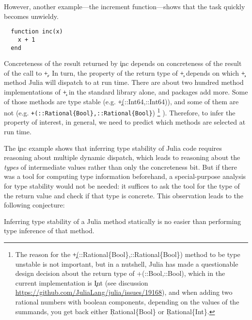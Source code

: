 \documentclass[sigplan,screen]{acmart}
\begin{document}
However, another example---the increment function---shows that the task quickly
becomes unwieldy.
%
\begin{lstlisting}
  function inc(x)
    x + 1
  end
\end{lstlisting}
%
Concreteness of the result returned by \c{inc} depends on concreteness of
the result of the call to \c{+}. In turn, the property of the return type of
\c{+} depends on which \c{+} method Julia will dispatch to at run time.
There are about two hundred method implementations of \c{+} in the standard
library alone, and packages add more. Some of those methods are type stable
(e.g. \c{+(::Int64,::Int64)}), and some of them are not (e.g.
\lstinline|+(::Rational{Bool},::Rational{Bool}|)
\footnote{%
  The reason for the
  \c{+(::Rational\{Bool\},::Rational\{Bool\})} method to be type
  unstable is not important, but in a nutshell, Julia has made a questionable
  design decision about the return type of \c{{+}(::Bool,::Bool)}, which in the
  current implementation is \c{Int}
  (see discussion \url{https://github.com/JuliaLang/julia/issues/19168}),
  and when adding two rational numbers with boolean components, depending on the
  values of the summands, you get back either \c{Rational\{Bool\}} or
  \c{Rational\{Int\}}.}
).
Therefore,
to infer the property of interest, in general,
we need to predict which methods are selected at run time.

The \c{inc} example shows that inferring type stability of Julia code
requires
reasoning about %
multiple dynamic dispatch, which leads
to reasoning about the \emph{types} of intermediate values rather than only
the concreteness bit. But if there was a tool for computing type information
beforehand, a special-purpose analysis for type stability would not be needed:
it suffices to ask the tool for the type of the return value and
check if that type is concrete.
This observation leads to the following conjecture:

\begin{conjecture}
  Inferring type stability of a Julia method statically is no easier than
  performing type inference of that method.
\end{conjecture}
\end{document}
